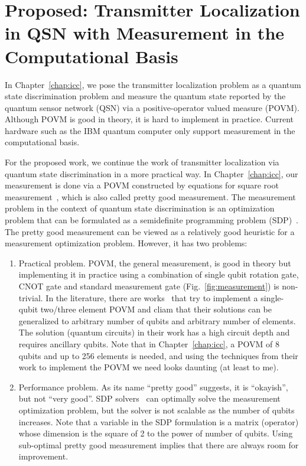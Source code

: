 \chapter{Proposed: Transmitter Localization in QSN with Measurement in the Computational Basis}
\label{chap:proposed}

In Chapter~\ref{chap:icc}, we pose the transmitter localization problem as a quantum state discrimination problem
and measure the quantum state reported by the quantum sensor network (QSN) via a positive-operator valued measure (POVM).
Although POVM is good in theory, it is hard to implement in practice.
Current hardware such as the IBM quantum computer only support measurement in the computational basis.

For the proposed work, we continue the work of transmitter localization via quantum state discrimination in a more practical way.
In Chapter~\ref{chap:icc}, our measurement is done via a POVM constructed by equations for square root measurement~\cite{prettygood},
which is also called pretty good measurement. The measurement problem in the context of quantum state discrimination is an optimization problem
that can be formulated as a semidefinite programming problem (SDP)~\cite{semidefinite}. 
The pretty good measurement can be viewed as a relatively good heuristic for a measurement optimization problem.
However, it has two problems:
\begin{enumerate}
    \item Practical problem. POVM, the general measurement, is good in theory but implementing it in practice using a combination of
          single qubit rotation gate, CNOT gate and standard measurement gate (Fig.~\ref{fig:measurement}) is non-trivial. 
          In the literature, there are works~\cite{pra19-povm,PhysRevResearch.povm} that try to implement a single-qubit two/three element POVM and cliam
          that their solutions can be generalized to arbitrary number of qubits and arbitrary number of elements. 
          The solution (quantum circuits) in their work has a high circuit depth and requires ancillary qubits.
          Note that in Chapter~\ref{chap:icc}, a POVM of 8 qubits and up to 256 elements is needed, and using the 
          techniques from their work to implement the POVM we need looks daunting (at least to me).
          
    \item Performance problem. As its name ``pretty good'' suggests, it is ``okayish'', but not ``very good''.
          SDP solvers~\cite{diamond2016cvxpy} can optimally solve the measurement optimization problem,
          but the solver is not scalable as the number of qubits increases. 
          Note that a variable in the SDP formulation is a matrix (operator) whose dimension is the square of 2 to the power of number of qubits.
          Using sub-optimal pretty good measurement implies that there are always room for improvement.
\end{enumerate}

